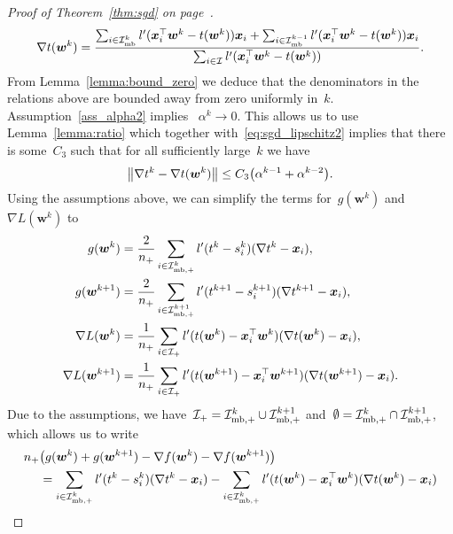 \begin{proof}[Proof of Theorem~\ref{thm:sgd} on page~\pageref{thm:sgd}]
  \begin{equation*}
    \nabla t(\bm{w}^k)
      = \frac{\sum_{i \in \mathcal{I}_{\text{mb}}^k} l'(\bm{x}_i^\top \bm{w}^k - t(\bm{w}^k))\bm{x}_i + \sum_{i \in \mathcal{I}_{\text{mb}}^{k-1}} l'(\bm{x}_i^\top \bm{w}^k - t(\bm{w}^k))\bm{x}_i}{\sum_{i \in \mathcal{I}} l'(\bm{x}_i^\top \bm{w}^k - t(\bm{w}^k))}.
  \end{equation*}
  From Lemma~\ref{lemma:bound_zero} we deduce that the denominators in the relations above are bounded away from zero uniformly in~$k$. Assumption~\ref{ass_alpha2} implies ~$\alpha^k \to 0$. This allows us to use Lemma~\ref{lemma:ratio} which together with~\eqref{eq:sgd_lipschitz2} implies that there is some~$C_3$ such that for all sufficiently large~$k$ we have
  \begin{equation}\label{eq:sgd_nablat_diff}
    \norm{\nabla t^k - \nabla t(\bm{w}^k)} \leq C_3\Brac{\alpha^{k-1} + \alpha^{k-2}}.
  \end{equation}
  Using the assumptions above, we can simplify the terms for~$g(\bm{w}^k)$ and~$\nabla L(\bm{w}^k)$ to
  \begin{equation*}
    \begin{aligned}
      g(\bm{w}^k)
        & = \frac{2}{n_{+}} \sum_{i \in \mathcal{I}_{\text{mb},+}^k} l'(t^k - s_i^k)(\nabla t^k - \bm{x}_i), \\
      g(\bm{w}^{k+1})
        & = \frac{2}{n_{+}} \sum_{i \in \mathcal{I}_{\text{mb},+}^{k+1}} l'(t^{k+1}-s_i^{k+1})(\nabla t^{k+1} - \bm{x}_i), \\
      \nabla L(\bm{w}^k)
        & = \frac{1}{n_{+}} \sum_{i \in \mathcal{I}_{+}} l'(t(\bm{w}^k) - \bm{x}_i^\top \bm{w}^k)(\nabla t(\bm{w}^k) - \bm{x}_i), \\
      \nabla L(\bm{w}^{k+1})
        & = \frac{1}{n_{+}} \sum_{i \in \mathcal{I}_{+}} l'(t(\bm{w}^{k+1}) - \bm{x}_i^\top \bm{w}^{k+1})(\nabla t(\bm{w}^{k+1}) - \bm{x}_i).
    \end{aligned}
  \end{equation*}
  Due to the assumptions, we have~$\mathcal{I}_{+} = \mathcal{I}_{\text{mb},+}^k \cup \mathcal{I}_{\text{mb},+}^{k+1}$ and~$\emptyset = \mathcal{I}_{\text{mb},+}^k \cap \mathcal{I}_{\text{mb},+}^{k+1}$, which allows us to write
  \begin{subequations}\label{eq:sgd_sum}
    \begin{align}
    \label{eq:sgd_sum1}
    \npos & \Brac{g(\bm{w}^k) + g(\bm{w}^{k+1}) - \nabla f(\bm{w}^k)-\nabla f(\bm{w}^{k+1})}\\
    \label{eq:sgd_sum2}
    & = \sum_{i \in \Imbpos^k} l'(t^k - s_i^k)(\nabla t^k - \bm{x}_i) - \sum_{i \in \Imbpos^k} l'(t(\bm{w}^k) - \bm{x}_i^\top \bm{w}^k)(\nabla t(\bm{w}^k) - \bm{x}_i) \\

\end{align}
\end{subequations}
\end{proof}
